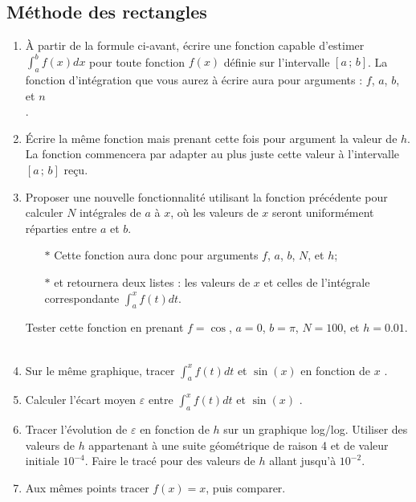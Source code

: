 \subsection{Méthode des rectangles}
\begin{enumerate}
\item À  partir de  la formule ci-avant,  écrire une  fonction capable
  d'estimer $\int_a^b  f(x)dx$ pour toute fonction  $f(x)$ définie sur
  l'intervalle $[a\,;\,b]$.  La fonction  d'intégration que vous aurez
  à   écrire  aura   pour  arguments   :   $f$,  $a$,   $b$,  et   $n$
  \\ .
\item Écrire la même fonction mais prenant cette fois pour argument la
  valeur de  $h$.  La  fonction commencera par  adapter au  plus juste
  cette valeur à l'intervalle $[a\,;\,b]$ reçu.
\item Proposer  une nouvelle  fonctionnalité utilisant la  fonction précédente
  pour calculer  $N$ intégrales de  $a$ à $x$,  où les valeurs  de $x$
  seront  uniformément  réparties  entre  $a$ et  $b$.
  \begin{itemize}
  \item[$\ast$] Cette fonction aura donc  pour arguments $f$, $a$, $b$,
    $N$, et $h$;
  \item[$\ast$] et retournera deux listes :  les valeurs   de  $x$   et
    celles  de   l'intégrale  correspondante $\int_a^xf(t)dt$.
  \end{itemize}
  Tester cette fonction en prenant $f=\cos$, $a=0$, $b=\pi$, $N=100$, et
  $h=0.01$.\\
  \\
\item  Sur le même graphique, tracer $\int_a^xf(t)dt$ et $\sin(x)$ en fonction de $x$
  .
\item  Calculer  l'écart  moyen $\varepsilon$ entre  $\int_a^xf(t)dt$  et  $\sin(x)$
  .
\item  Tracer l'évolution  de  $\varepsilon$  en fonction  de  $h$ sur  un
  graphique   log/log. Utiliser  des valeurs  de  $h$  appartenant à  une  suite
  géométrique de  raison 4 et  de valeur initiale $10^{-4}$.  Faire le
  tracé pour des valeurs de $h$ allant jusqu'à $10^{-2}$.
\item Aux   mêmes  points   tracer  $f(x)=x$,   puis  comparer.

  
\end{enumerate}

